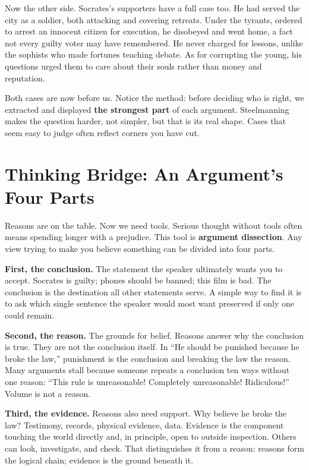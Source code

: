 Now the other side. Socrates's supporters have a full case too. He had served the city as a soldier, both attacking and covering retreats. Under the tyrants, ordered to arrest an innocent citizen for execution, he disobeyed and went home, a fact not every guilty voter may have remembered. He never charged for lessons, unlike the sophists who made fortunes teaching debate. As for corrupting the young, his questions urged them to care about their souls rather than money and reputation.

Both cases are now before us. Notice the method: before deciding who is right, we extracted and displayed \textbf{the strongest part} of each argument. Steelmanning makes the question harder, not simpler, but that is its real shape. Cases that seem easy to judge often reflect corners you have cut.

\section{Thinking Bridge: An Argument's Four Parts}
Reasons are on the table. Now we need tools. Serious thought without tools often means spending longer with a prejudice. This tool is \textbf{argument dissection}. Any view trying to make you believe something can be divided into four parts.

\textbf{First, the conclusion.} The statement the speaker ultimately wants you to accept. Socrates is guilty; phones should be banned; this film is bad. The conclusion is the destination all other statements serve. A simple way to find it is to ask which single sentence the speaker would most want preserved if only one could remain.

\textbf{Second, the reason.} The grounds for belief. Reasons answer why the conclusion is true. They are not the conclusion itself. In ``He should be punished because he broke the law,'' punishment is the conclusion and breaking the law the reason. Many arguments stall because someone repeats a conclusion ten ways without one reason: ``This rule is unreasonable! Completely unreasonable! Ridiculous!'' Volume is not a reason.

\textbf{Third, the evidence.} Reasons also need support. Why believe he broke the law? Testimony, records, physical evidence, data. Evidence is the component touching the world directly and, in principle, open to outside inspection. Others can look, investigate, and check. That distinguishes it from a reason: reasons form the logical chain; evidence is the ground beneath it.

